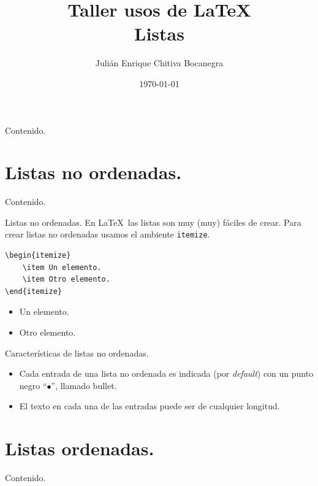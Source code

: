 \documentclass[dvipsnames,xcolor, handout]{beamer}
\title{Taller usos de \LaTeX \\ \small{Listas} \vspace*{-0.2cm}}
\author[Julián Chitiva Bocanegra]{Julián Enrique Chitiva Bocanegra}
\institute[Uniandes] 
{Universidad de los Andes\\ Facultad de Economía}
\date{\today}
\theoremstyle{plain}
\theoremstyle{definition}
\begin{document}
\begin{frame}
  \titlepage
\end{frame}

\begin{frame}{Contenido.}
  \tableofcontents
\end{frame}

\section{Listas no ordenadas.}
\begin{frame}{Contenido.}
  \tableofcontents[currentsection]
\end{frame}

\begin{frame}[fragile]{Listas no ordenadas.}
    En \LaTeX\ las listas son muy (muy) fáciles de crear. Para crear listas no ordenadas usamos el ambiente \verb!itemize!.
    
    \begin{minipage}{0.5\linewidth}
\begin{verbatim}
\begin{itemize}
    \item Un elemento.
    \item Otro elemento.
\end{itemize}    
\end{verbatim}
    \end{minipage}\pause
    \begin{minipage}{0.5\linewidth}
    \begin{itemize}
    \item Un elemento.
    \item Otro elemento.
\end{itemize}    
    \end{minipage}
\end{frame}

\begin{frame}[fragile]{Características de listas no ordenadas.}
    \begin{itemize}
        \item Cada entrada de una lista no ordenada es indicada (por \textit{default}) con un punto negro ``$\bullet$'', llamado bullet.
        \item El texto en cada una de las entradas puede ser de cualquier longitud. 
    \end{itemize}
\end{frame}

\section{Listas ordenadas.}
\begin{frame}{Contenido.}
  \tableofcontents[currentsection]
\end{frame}
\end{document}
